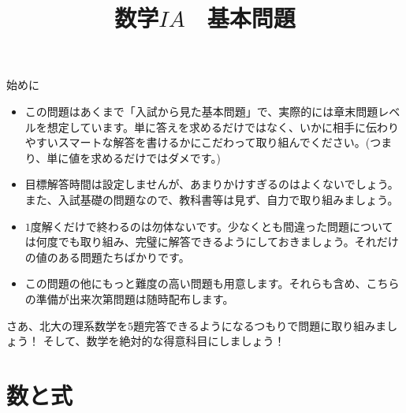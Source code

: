 \documentclass[10pt,a4paper,fleqn]{jsarticle}
\title{数学$IA$　基本問題}
\date{}
\author{}
\begin{document}
\maketitle

\begin{itembox}{始めに}
\begin{flushleft}
\begin{itemize}
\item この問題はあくまで「入試から見た基本問題」で、実際的には章末問題レベルを想定しています。単に答えを求めるだけではなく、いかに相手に伝わりやすいスマートな解答を書けるかにこだわって取り組んでください。(つまり、単に値を求めるだけではダメです。)\\
\item 目標解答時間は設定しませんが、あまりかけすぎるのはよくないでしょう。また、入試基礎の問題なので、教科書等は見ず、自力で取り組みましょう。\\
\item $1$度解くだけで終わるのは勿体ないです。少なくとも間違った問題については何度でも取り組み、完璧に解答できるようにしておきましょう。それだけの値のある問題たちばかりです。
\item この問題の他にもっと難度の高い問題も用意します。それらも含め、こちらの準備が出来次第問題は随時配布します。\\
\end{itemize}
\end{flushleft}
\end{itembox}

さあ、北大の理系数学を$5$題完答できるようになるつもりで問題に取り組みましょう！
そして、数学を絶対的な得意科目にしましょう！


\section{数と式}
\end{document}

